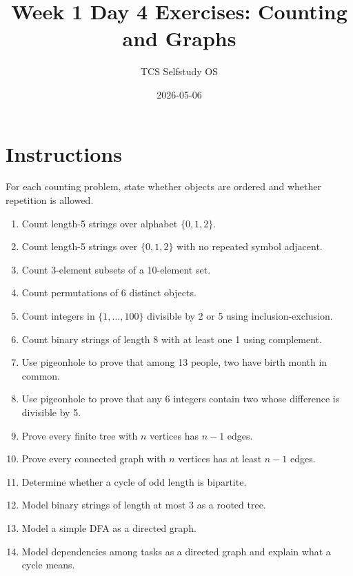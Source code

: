 \documentclass[11pt]{article}
\title{Week 1 Day 4 Exercises: Counting and Graphs}
\author{TCS Selfstudy OS}
\date{2026-05-06}
\begin{document}
\maketitle

\section*{Instructions}
For each counting problem, state whether objects are ordered and whether repetition is allowed.

\begin{enumerate}[label=\textbf{D4.\arabic*.}]
\item Count length-5 strings over alphabet $\{0,1,2\}$.
\item Count length-5 strings over $\{0,1,2\}$ with no repeated symbol adjacent.
\item Count 3-element subsets of a 10-element set.
\item Count permutations of 6 distinct objects.
\item Count integers in $\{1,\dots,100\}$ divisible by 2 or 5 using inclusion-exclusion.
\item Count binary strings of length 8 with at least one 1 using complement.
\item Use pigeonhole to prove that among 13 people, two have birth month in common.
\item Use pigeonhole to prove that any 6 integers contain two whose difference is divisible by 5.
\item Prove every finite tree with $n$ vertices has $n-1$ edges.
\item Prove every connected graph with $n$ vertices has at least $n-1$ edges.
\item Determine whether a cycle of odd length is bipartite.
\item Model binary strings of length at most 3 as a rooted tree.
\item Model a simple DFA as a directed graph.
\item Model dependencies among tasks as a directed graph and explain what a cycle means.
\end{enumerate}
\end{document}
